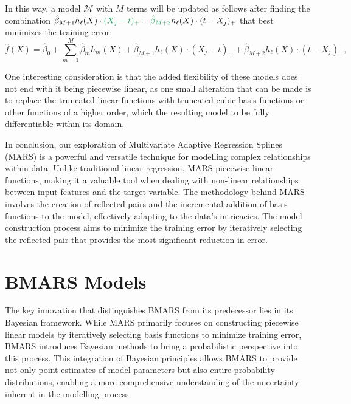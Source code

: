 In this way, a model $\mathcal{M}$ with $M$ terms will be updated as follows after finding the combination $\hat \beta_{M+1} h_\ell(X) \cdot \green{(X_j - t)_+} + \green{\hat \beta_{M+2}} h_\ell(X) \cdot (t-X_j)_+$ that best minimizes the training error:
$$
\hat f(X) = \hat \beta_0 + \sum_{m=1}^M \hat \beta_m h_m(X) + \hat \beta_{M+1} h_\ell(X) \cdot (X_j - t)_+ + \hat \beta_{M+2} h_\ell(X) \cdot (t-X_j)_+,
$$

One interesting consideration is that the added flexibility of these models does not end with it being piecewise linear, as one small alteration that can be made is to replace the truncated linear functions with truncated cubic basis functions or other functions of a higher order, which  the resulting model to be fully differentiable within its domain. 

In conclusion, our exploration of Multivariate Adaptive Regression Splines (MARS) is a powerful and versatile technique for modelling complex relationships within data. Unlike traditional linear regression, MARS  piecewise linear functions, making it a valuable tool when dealing with non-linear relationships between input features and the target variable. The methodology behind MARS involves the creation of reflected pairs and the incremental addition of basis functions to the model, effectively adapting to the data's intricacies. The model construction process aims to minimize the training error by iteratively selecting the reflected pair that provides the most significant reduction in error.

\section{BMARS Models}

The key innovation that distinguishes BMARS from its predecessor lies in its Bayesian framework. While MARS primarily focuses on constructing piecewise linear models by iteratively selecting basis functions to minimize training error, BMARS introduces Bayesian methods to bring a probabilistic perspective into this process. This integration of Bayesian principles allows BMARS to provide not only point estimates of model parameters but also entire probability distributions, enabling a more comprehensive understanding of the uncertainty inherent in the modelling process.


